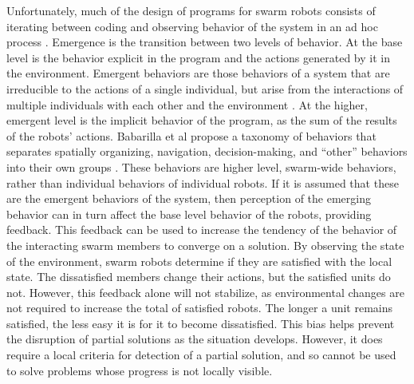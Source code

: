 \documentclass[]{article}
\begin{document}
Unfortunately, much of the design of programs for swarm robots consists of iterating between coding and observing behavior of the system in an ad hoc process \cite{palmer2005behavioral}. 
Emergence is the transition between two levels of behavior. 
At the base level is the behavior explicit in the program and the actions generated by it in the environment. 
Emergent behaviors are those behaviors of a system that are irreducible to the actions of a single individual, but arise from the interactions of multiple individuals with each other and the environment \cite{tsuda2004robust}.
At the higher, emergent level is the implicit behavior of the program, as the sum of the results of the robots' actions. 
Babarilla et al propose a taxonomy of behaviors that separates spatially organizing, navigation, decision-making, and ``other'' behaviors into their own groups \cite{brambilla2013swarm}. 
These behaviors are higher level, swarm-wide behaviors, rather than individual behaviors of individual robots. 
If it is assumed that these are the emergent behaviors of the system, then perception of the emerging behavior can in turn affect the base level behavior of the robots, providing feedback. 
This feedback can be used to increase the tendency of the behavior of the interacting swarm members to converge on a solution. 
By observing the state of the environment, swarm robots determine if they are satisfied with the local state. 
The dissatisfied members change their actions, but the satisfied units do not. 
However, this feedback alone will not stabilize, as environmental changes are not required to increase the total of satisfied robots. 
The longer a unit remains satisfied, the less easy it is for it to become dissatisfied. 
This bias helps prevent the disruption of partial solutions as the situation develops. 
However, it does require a local criteria for detection of a partial solution, and so cannot be used to solve problems whose progress is not locally visible. 
\end{document}
